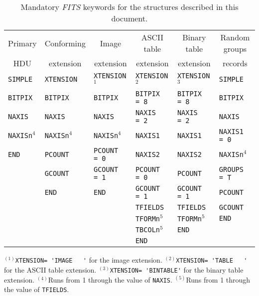\documentclass[onecolumn]{aa}
\begin{document}
\begin{table}[hbp]
\begin{center}
\caption[Mandatory {\em FITS\/} keywords.]                                        
         {Mandatory {\em FITS\/} keywords for the 
          structures described in this document.}        
\label{ta:mandatorykeys}
\begin{tabular}{llllll} 
\hline \hline
\multicolumn{1}{c}{Primary}  & \multicolumn{1}{c}{Conforming}     & 
\multicolumn{1}{c}{Image} &\multicolumn{1}{c}{ASCII table} & 
\multicolumn{1}{c}{Binary table}&\multicolumn{1}{c}{Random groups} \\ 
\multicolumn{1}{c}{HDU}        & \multicolumn{1}{c}{extension}    & \multicolumn{1}{c}{extension}   & \multicolumn{1}{c}{extension}   &
\multicolumn{1}{c}{extension}& \multicolumn{1}{c}{records}\\ 
\hline
{\tt SIMPLE}        & {\tt XTENSION}      & {\tt XTENSION}$^{1}$ & {\tt XTENSION}$^{2}$  & {\tt XTENSION}$^{3}$ & {\tt SIMPLE}    \\
{\tt BITPIX}        & {\tt BITPIX}        & {\tt BITPIX}         & {\verb+BITPIX  = 8+}  & {\verb+BITPIX  = 8+} & {\tt BITPIX} \\
{\tt NAXIS}         & {\tt NAXIS}         & {\tt NAXIS}          & {\verb+NAXIS   = 2+}  & {\verb+NAXIS   = 2+} & {\tt NAXIS} \\
{\tt NAXISn}$^{4}$  & {\tt NAXISn}$^{4}$  & {\tt NAXISn}$^{4}$   & {\tt NAXIS1}          & {\tt NAXIS1}         & {\verb+NAXIS1  = 0+} \\
{\tt END }          & {\tt PCOUNT}        & {\verb+PCOUNT  = 0+} & {\tt NAXIS2}          & {\tt NAXIS2}         & {\tt NAXISn}$^{4}$ \\
                    & {\tt GCOUNT}        & {\verb+GCOUNT  = 1+} & {\verb+PCOUNT  = 0+}  & {\tt PCOUNT}         & {\verb+GROUPS  = T+} \\
                    & {\tt END}           & {\tt END}            & {\verb+GCOUNT  = 1+}  & {\verb+GCOUNT  = 1+} & {\tt PCOUNT}   \\
                    &                     &                      & {\tt TFIELDS}         & {\tt TFIELDS}        & {\tt GCOUNT}     \\
                    &                     &                      & {\tt TFORMn}$^{5}$    & {\tt TFORMn}$^{5}$   & {\tt END}       \\
                    &                     &                      & {\tt TBCOLn}$^{5}$    & {\tt END}            &                \\
                    &                     &                      & {\tt END}             &                      &                \\ \hline
\end{tabular}
\end{center}
$^{(1)}$\verb*+XTENSION= 'IMAGE   '+ for the
   image extension. 
$^{(2)}$\verb*+XTENSION= 'TABLE   '+ for the 
    ASCII table extension. 
$^{(3)}$\verb*+XTENSION= 'BINTABLE'+ for the binary table
   extension.
$^{(4)}$Runs from 1 through the value of {\tt NAXIS}.
$^{(5)}$Runs from 1 through the value of {\tt TFIELDS}.                       
\end{table}              
\end{document}
